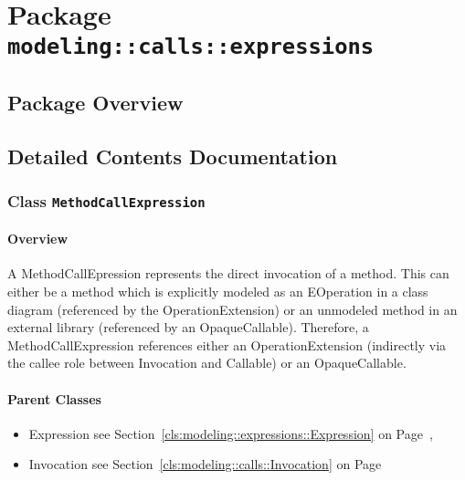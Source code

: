 \section{Package \bfseries \texttt{modeling::calls::expressions}\normalfont}
\subsection{Package Overview}
	
			
		



\subsection{Detailed Contents Documentation}
\subsubsection{\Large{Class \bfseries \texttt{MethodCallExpression}\normalfont}}
\label{cls:modeling::calls::expressions::MethodCallExpression} 
\paragraph{Overview}

	
			
A MethodCallEpression represents the direct invocation of a method. This can either be a method which is explicitly modeled as an EOperation in a class diagram (referenced by the OperationExtension) or an unmodeled method in an external library (referenced by an OpaqueCallable). Therefore, a MethodCallExpression references either an OperationExtension (indirectly via the callee role between Invocation and Callable) or an OpaqueCallable.	
		
	



\paragraph{Parent Classes}
\begin{itemize}
\item Expression see Section~\ref{cls:modeling::expressions::Expression} on Page~\pageref{cls:modeling::expressions::Expression}, \item Invocation see Section~\ref{cls:modeling::calls::Invocation} on Page~\pageref{cls:modeling::calls::Invocation}\end{itemize}
